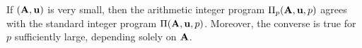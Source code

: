 \documentclass{amsart}
\begin{document}
\begin{lemma}
   \label{ip = aip: L}
   If $(\mathbf{A},\mathbf{u})$ is very small, then the arithmetic integer program $\Pi_p(\mathbf{A}, \mathbf{u}, p)$ agrees with the standard integer program $\Pi(\mathbf{A}, \mathbf{u}, p)$.
   Moreover, the converse is true for $p$ sufficiently large, depending solely on $\mathbf{A}$.
\end{lemma}
\end{document}
